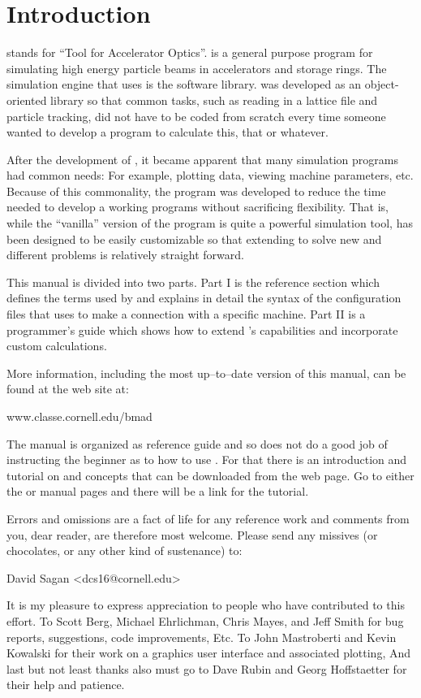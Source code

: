 \section*{Introduction}
\label{c:introduction}

\tao stands for ``Tool for Accelerator Optics''. \tao is a general purpose program for simulating
high energy particle beams in accelerators and storage rings. The simulation engine that \tao uses
is the \bmad software library\cite{b:bmad}. \bmad was developed as an object-oriented library so
that common tasks, such as reading in a lattice file and particle tracking, did not have to be coded
from scratch every time someone wanted to develop a program to calculate this, that or whatever.

After the development of \bmad, it became apparent that many simulation programs had common needs:
For example, plotting data, viewing machine parameters, etc. Because of this commonality, the \tao
program was developed to reduce the time needed to develop a working programs without sacrificing
flexibility. That is, while the ``vanilla'' version of the \tao program is quite a powerful
simulation tool, \tao has been designed to be easily customizable so that extending \tao to solve
new and different problems is relatively straight forward.

This manual is divided into two parts. Part I is the reference section which defines the terms used
by \tao and explains in detail the syntax of the configuration files that \tao uses to make a
connection with a specific machine. Part II is a programmer's guide which shows how to extend
\tao's capabilities and incorporate custom calculations.

More information, including the most up--to--date version of this
manual, can be found at the \bmad web site at:
\begin{example}
  www.classe.cornell.edu/bmad
\end{example}

\vspace{0.1in}
The \tao manual is organized as reference guide and so does not do a good job of instructing the
beginner as to how to use \tao. For that there is an introduction and tutorial on \bmad and \tao
concepts that can be downloaded from the \bmad web page. Go to either the \bmad or \tao manual pages
and there will be a link for the tutorial.

Errors and omissions are a fact of life for any reference work and comments from you, dear reader,
are therefore most welcome. Please send any missives (or chocolates, or any other kind of
sustenance) to:
\begin{example}
  David Sagan <dcs16@cornell.edu>
\end{example}

It is my pleasure to express appreciation to people who have contributed to this effort. To Scott
Berg, Michael Ehrlichman, Chris Mayes, and Jeff Smith for bug reports, suggestions, code
improvements, Etc. To John Mastroberti and Kevin Kowalski for their work on a graphics user
interface and associated plotting, And last but not least thanks also must go to Dave Rubin and
Georg Hoffstaetter for their help and patience.
